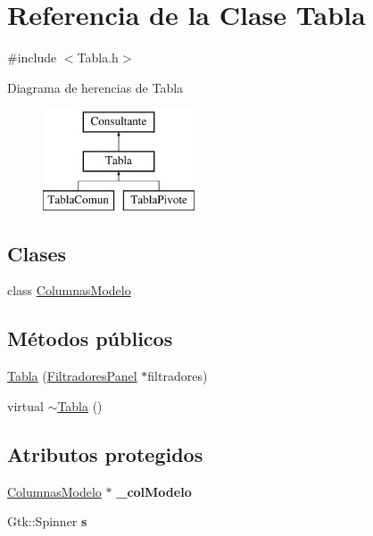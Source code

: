 \hypertarget{classTabla}{\section{\-Referencia de la \-Clase \-Tabla}
\label{classTabla}
}


{\ttfamily \#include $<$\-Tabla.\-h$>$}

\-Diagrama de herencias de \-Tabla\begin{figure}[H]
\begin{center}
\leavevmode
\includegraphics[height=3.000000cm]{classTabla}
\end{center}
\end{figure}
\subsection*{\-Clases}
\begin{DoxyCompactItemize}
\item 
class \hyperlink{classTabla_1_1ColumnasModelo}{\-Columnas\-Modelo}
\end{DoxyCompactItemize}
\subsection*{\-Métodos públicos}
\begin{DoxyCompactItemize}
\item 
\hyperlink{classTabla_a5f706778a45d00ba0bc0702b00a08a07}{\-Tabla} (\hyperlink{classFiltradoresPanel}{\-Filtradores\-Panel} $\ast$filtradores)
\item 
virtual \hyperlink{classTabla_a66b3d75f8c5b93b1cdaa7896485109b1}{$\sim$\-Tabla} ()
\end{DoxyCompactItemize}
\subsection*{\-Atributos protegidos}
\begin{DoxyCompactItemize}
\item 
\hypertarget{classTabla_a2ca4f3be5d0ab58a7d161b34a3d65e11}{\hyperlink{classTabla_1_1ColumnasModelo}{\-Columnas\-Modelo} $\ast$ {\bfseries \-\_\-col\-Modelo}}\label{classTabla_a2ca4f3be5d0ab58a7d161b34a3d65e11}

\item 
\hypertarget{classTabla_a384e597ba032b9bf27e7d12f0474b4fa}{\-Gtk\-::\-Spinner {\bfseries s}}\label{classTabla_a384e597ba032b9bf27e7d12f0474b4fa}

\end{DoxyCompactItemize}


